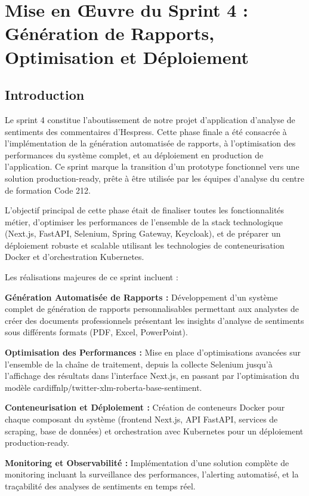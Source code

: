 \chapter{Mise en Œuvre du Sprint 4 : Génération de Rapports, Optimisation et Déploiement}

\section{Introduction}

Le sprint 4 constitue l'aboutissement de notre projet d'application d'analyse de sentiments des commentaires d'Hespress. Cette phase finale a été consacrée à l'implémentation de la génération automatisée de rapports, à l'optimisation des performances du système complet, et au déploiement en production de l'application. Ce sprint marque la transition d'un prototype fonctionnel vers une solution production-ready, prête à être utilisée par les équipes d'analyse du centre de formation Code 212.

L'objectif principal de cette phase était de finaliser toutes les fonctionnalités métier, d'optimiser les performances de l'ensemble de la stack technologique (Next.js, FastAPI, Selenium, Spring Gateway, Keycloak), et de préparer un déploiement robuste et scalable utilisant les technologies de conteneurisation Docker et d'orchestration Kubernetes.

Les réalisations majeures de ce sprint incluent :

\textbf{Génération Automatisée de Rapports :} Développement d'un système complet de génération de rapports personnalisables permettant aux analystes de créer des documents professionnels présentant les insights d'analyse de sentiments sous différents formats (PDF, Excel, PowerPoint).

\textbf{Optimisation des Performances :} Mise en place d'optimisations avancées sur l'ensemble de la chaîne de traitement, depuis la collecte Selenium jusqu'à l'affichage des résultats dans l'interface Next.js, en passant par l'optimisation du modèle cardiffnlp/twitter-xlm-roberta-base-sentiment.

\textbf{Conteneurisation et Déploiement :} Création de conteneurs Docker pour chaque composant du système (frontend Next.js, API FastAPI, services de scraping, base de données) et orchestration avec Kubernetes pour un déploiement production-ready.

\textbf{Monitoring et Observabilité :} Implémentation d'une solution complète de monitoring incluant la surveillance des performances, l'alerting automatisé, et la traçabilité des analyses de sentiments en temps réel.


